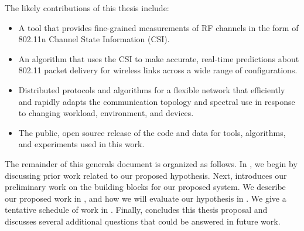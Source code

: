 The likely contributions of this thesis include:
\begin{itemize}
	\item A tool that provides fine-grained measurements of RF channels in the form of 802.11n Channel State Information (CSI).
	\item An algorithm that uses the CSI to make accurate, real-time predictions about 802.11 packet delivery for wireless links across a wide range of configurations.
	\item Distributed protocols and algorithms for a flexible network that efficiently and rapidly adapts the communication topology and spectral use in response to changing workload, environment, and devices.
	\item The public, open source release of the code and data for tools, algorithms, and experiments used in this work.
\end{itemize}
The remainder of this generals document is organized as follows. In , we begin by discussing prior work related to our proposed hypothesis. Next,  introduces our preliminary work on the building blocks for our proposed system. We describe our proposed work in , and how we will evaluate our hypothesis in . We give a tentative schedule of work in . Finally,  concludes this thesis proposal and discusses several additional questions that could be answered in future work.

